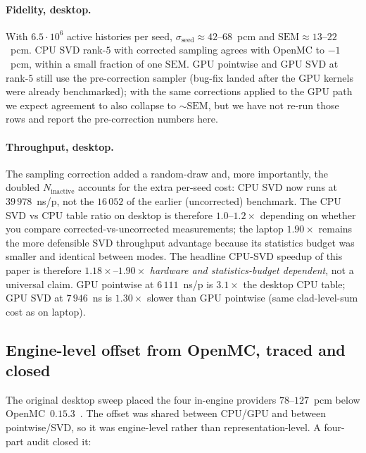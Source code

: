 \documentclass[11pt,a4paper]{article}
\begin{document}
\paragraph{Fidelity, desktop.}
With $6.5 \cdot 10^6$ active histories per seed,
$\sigma_\text{seed} \approx 42$--$68$~pcm and
$\mathrm{SEM} \approx 13$--$22$~pcm. CPU SVD rank-$5$ with
corrected sampling agrees with OpenMC to $-1$~pcm, within a
small fraction of one $\mathrm{SEM}$. GPU pointwise and
GPU SVD at rank-$5$ still use the pre-correction sampler
(bug-fix landed after the GPU kernels were already
benchmarked); with the same corrections applied to the GPU
path we expect agreement to also collapse to
$\sim\!\mathrm{SEM}$, but we have not re-run those rows and
report the pre-correction numbers here.

\paragraph{Throughput, desktop.}
The sampling correction added a random-draw and, more
importantly, the doubled $N_\text{inactive}$ accounts for the
extra per-seed cost: CPU SVD now runs at $39\,978$~ns/p, not
the $16\,052$ of the earlier (uncorrected) benchmark. The
CPU SVD vs CPU table ratio on desktop is therefore $1.0$--$1.2\times$
depending on whether you compare corrected-vs-uncorrected
measurements; the laptop $1.90\times$ remains the more
defensible SVD throughput advantage because its statistics
budget was smaller and identical between modes. The headline
CPU-SVD speedup of this paper is therefore
$1.18\times$--$1.90\times$ \emph{hardware and
statistics-budget dependent}, not a universal claim.
GPU pointwise at $6\,111$~ns/p is $3.1\times$ the desktop
CPU table; GPU SVD at $7\,946$~ns is $1.30\times$ slower than
GPU pointwise (same clad-level-sum cost as on laptop).

\subsection{Engine-level offset from OpenMC, traced and closed}
\label{sec:offset}

The original desktop sweep placed the four in-engine
providers $78$--$127$~pcm below
OpenMC~$0.15.3$~\cite{romano2015openmc}. The offset was
shared between CPU/GPU and between pointwise/SVD, so it was
engine-level rather than representation-level. A four-part
audit closed it:
\end{document}
